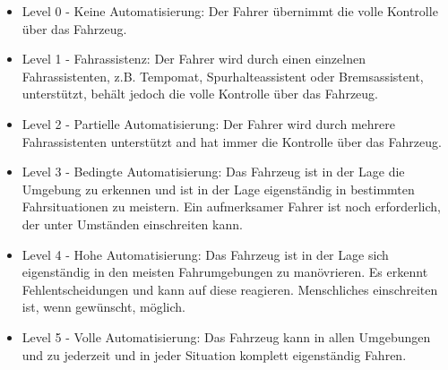 \begin{itemize}
    \item Level 0 - Keine Automatisierung: Der Fahrer übernimmt die volle Kontrolle über das Fahrzeug.\\

    \item Level 1 - Fahrassistenz: Der Fahrer wird durch einen einzelnen Fahrassistenten, z.B. Tempomat, Spurhalteassistent oder Bremsassistent, unterstützt, behält jedoch die volle Kontrolle über das Fahrzeug.\\
    
    \item Level 2 - Partielle Automatisierung: Der Fahrer wird durch mehrere Fahrassistenten unterstützt and hat immer die Kontrolle über das Fahrzeug.\\
    
    \item Level 3 - Bedingte Automatisierung: Das Fahrzeug ist in der Lage die Umgebung zu erkennen und ist in der Lage eigenständig in bestimmten Fahrsituationen zu meistern. Ein aufmerksamer Fahrer ist noch erforderlich, der unter Umständen einschreiten kann.\\
    
    \item Level 4 - Hohe Automatisierung: Das Fahrzeug ist in der Lage sich eigenständig in den meisten Fahrumgebungen zu manövrieren. Es erkennt Fehlentscheidungen und kann auf diese reagieren. Menschliches einschreiten ist, wenn gewünscht, möglich.\\
    
    \item Level 5 - Volle Automatisierung: Das Fahrzeug kann in allen Umgebungen und zu jederzeit und in jeder Situation komplett eigenständig Fahren.\\
\end{itemize}